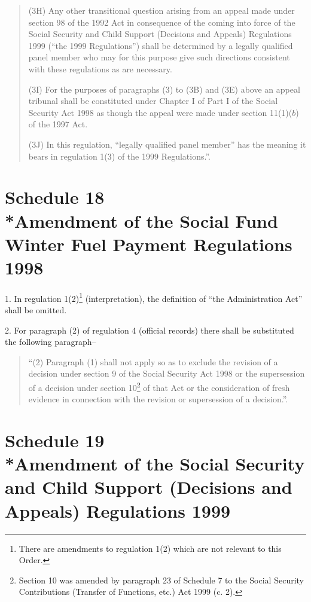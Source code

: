 \documentclass[12pt,a4paper]{article}
\begin{document}
\begin{quotation}
(3H) Any other transitional question arising from an appeal made under section 98 of the 1992 Act in consequence of the coming into force of the Social Security and Child Support (Decisions and Appeals) Regulations 1999 (“the 1999 Regulations”) shall be determined by a legally qualified panel member who may for this purpose give such directions consistent with these regulations as are necessary.

(3I) For the purposes of paragraphs (3) to (3B) and (3E) above an appeal tribunal shall be constituted under Chapter I of Part I of the Social Security Act 1998 as though the appeal were made under section 11(1)($b$)  of the 1997 Act.

(3J) In this regulation, “legally qualified panel member” has the meaning it bears in regulation 1(3) of the 1999 Regulations.”.
\end{quotation}

\part[Schedule 18 --- Amendment of the Social Fund Winter Fuel Payment Regulations 1998]{Schedule 18\\*Amendment of the Social Fund Winter Fuel Payment Regulations 1998}

\renewcommand\parthead{--- Schedule 18}

1.  In regulation 1(2)\footnote{\frenchspacing There are amendments to regulation 1(2) which are not relevant to this Order.} (interpretation), the definition of “the Administration Act” shall be omitted.

\medskip

2.  For paragraph (2) of regulation 4 (official records) there shall be substituted the following paragraph–
\begin{quotation}
“(2) Paragraph (1) shall not apply so as to exclude the revision of a decision under section 9 of the Social Security Act 1998 or the supersession of a decision under section 10\footnote{\frenchspacing Section 10 was amended by paragraph 23 of Schedule 7 to the Social Security Contributions (Transfer of Functions, etc.) Act 1999 (c. 2).} of that Act or the consideration of fresh evidence in connection with the revision or supersession of a decision.”.
\end{quotation}

\part[Schedule 19 --- Amendment of the Social Security and Child Support (Decisions and Appeals) Regulations 1999]{Schedule 19\\*Amendment of the Social Security and Child Support (Decisions and Appeals) Regulations 1999}
\end{document}
